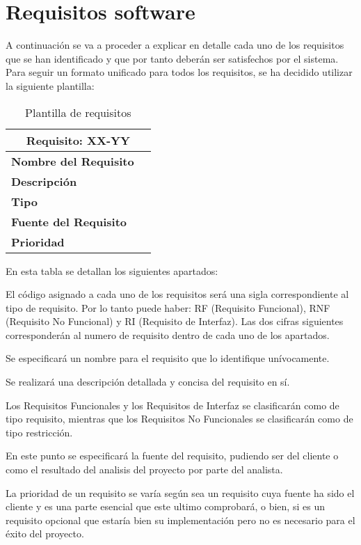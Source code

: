 \section{Requisitos software}

\par A continuación se va a proceder a explicar en detalle cada uno de los requisitos que se han identificado y que por tanto deberán ser satisfechos por el sistema. Para seguir un formato unificado para todos los requisitos, se ha decidido utilizar la siguiente plantilla:
\begin{table}[H]
\begin{center}
\begin{tabular}{p{} p{7cm}}
\multicolumn{2}{c}{\textbf{Requisito: XX-YY} } \\
\hline \hline
\textbf{Nombre del Requisito} &   \\
\hline
\textbf{Descripción} &  \\
\hline
\textbf{Tipo} &  \\
\hline
\textbf{Fuente del Requisito} &   \\
\hline
\textbf{Prioridad} &   \\ \hline
\end{tabular}
\caption{Plantilla de requisitos}
\label{tab:Plantilla-Requisitos}
\end{center}
\end{table}

\par En esta tabla se detallan los siguientes apartados:
\begin{description}[style=multiline, leftmargin=4cm]
\item[\textbf{Requisito XX-YY:}] El código asignado a cada uno de los requisitos será una sigla correspondiente al tipo de requisito. Por lo tanto puede haber: RF (Requisito Funcional), RNF (Requisito No Funcional) y RI (Requisito de Interfaz). Las dos cifras siguientes corresponderán al numero de requisito dentro de cada uno de los apartados.
\item[\textbf{Nombre del Requisito:}] Se especificará un nombre para el requisito que lo identifique unívocamente.
\item[\textbf{Descripción:}] Se realizará una descripción detallada y concisa del requisito en sí.
\item[\textbf{Tipo:}] Los Requisitos Funcionales y los Requisitos de Interfaz se clasificarán como de tipo requisito, mientras que los Requisitos No Funcionales se clasificarán como de tipo restricción.
\item[\textbf{Fuente del Requisito:}] En este punto se especificará la fuente del requisito, pudiendo ser del cliente o como el resultado del analisis del proyecto por parte del analista.
\item[\textbf{Prioridad:}] La prioridad de un requisito se varía según sea un requisito cuya fuente ha sido el cliente y es una parte esencial que este ultimo comprobará, o bien, si es un requisito opcional que estaría bien su implementación pero no es necesario para el éxito del proyecto.
\end{description}

